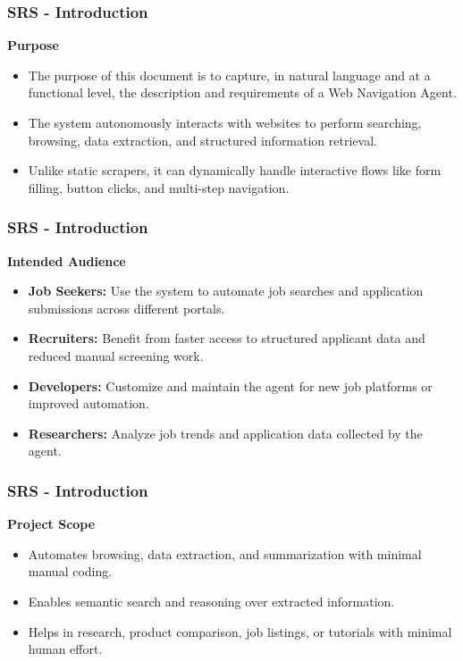 \documentclass{beamer}
\begin{document}
\begin{frame}
\frametitle{SRS - Introduction}
\textbf{Purpose}
\begin{itemize}
    \item The purpose of this document is to capture, in natural language and at a functional level, the description and requirements of a Web Navigation Agent. 
    \item The system autonomously interacts with websites to perform searching, browsing, data extraction, and structured information retrieval. 
    \item Unlike static scrapers, it can dynamically handle interactive flows like form filling, button clicks, and multi-step navigation.
\end{itemize}
\end{frame}

\begin{frame}
\frametitle{SRS - Introduction}
\textbf{Intended Audience}
\begin{itemize}
    \item \textbf{Job Seekers:} Use the system to automate job searches and application submissions across different portals.
    
    \item \textbf{Recruiters:} Benefit from faster access to structured applicant data and reduced manual screening work.
    
    \item \textbf{Developers:} Customize and maintain the agent for new job platforms or improved automation.
    
    \item \textbf{Researchers:} Analyze job trends and application data collected by the agent.
\end{itemize}
\end{frame}

\begin{frame}
\frametitle{SRS - Introduction}
\textbf{Project Scope}
\begin{itemize}
    \item Automates browsing, data extraction, and summarization with minimal manual coding.
    \item Enables semantic search and reasoning over extracted information.  
    \item Helps in research, product comparison, job listings, or tutorials with minimal human effort.
\end{itemize}
\end{frame}
\end{document}
